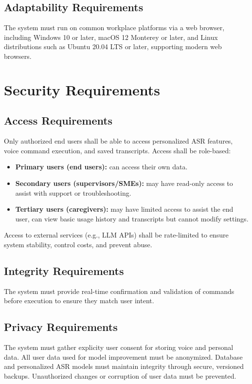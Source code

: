 \documentclass[12pt]{article}
\begin{document}
\subsection{Adaptability Requirements}
The system must run on common workplace platforms via a web browser, including Windows 10 or later, macOS 12 Monterey or later, and Linux distributions such as Ubuntu 20.04 LTS or later, supporting modern web browsers.

\section{Security Requirements}
\subsection{Access Requirements}
Only authorized end users shall be able to access personalized ASR features, voice command execution, and saved transcripts. Access shall be role-based:

\begin{itemize}
    \item \textbf{Primary users (end users):} can access their own data.
    \item \textbf{Secondary users (supervisors/SMEs):} may have read-only access to assist with support or troubleshooting.
    \item \textbf{Tertiary users (caregivers):} may have limited access to assist the end user, can view basic usage history and transcripts but cannot modify settings.
\end{itemize}

Access to external services (e.g., LLM APIs) shall be rate-limited to ensure system stability, control costs, and prevent abuse.
\subsection{Integrity Requirements}
The system must provide real-time confirmation and validation of commands before execution to ensure they match user intent. 
\subsection{Privacy Requirements}
The system must gather explicity user consent for storing voice and personal data. All user data used for model improvement must be anonymized. Database and personalized ASR models must maintain integrity through secure, versioned backups. Unauthorized changes or corruption of user data must be prevented. 
\end{document}
